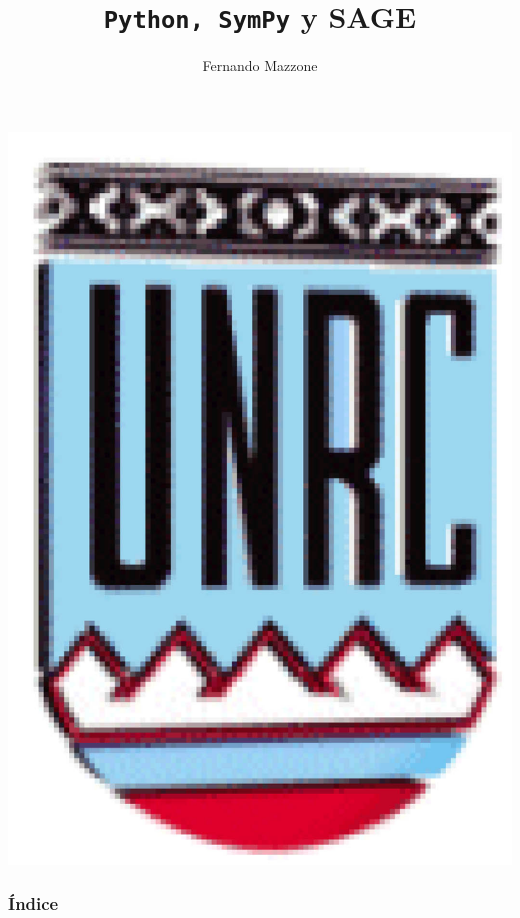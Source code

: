 \documentclass[hyperref={colorlinks=true}]{beamer}
\title[python, SymPy, SAGE] %
{%
\texttt{Python, SymPy} y SAGE
}
\author[] %
{Fernando Mazzone}
\institute[Depto de Matemática] %
{
 Depto de Matemática\\
Facultad de Ciencias Exactas Físico-Químicas y Naturales\\
Universidad Nacional de Río Cuarto}
\begin{document}
\begin{frame}
  \maketitle
  \begin{center}
   \includegraphics[scale=0.2]{imagenes/unrc.jpg}
   \end{center}
\end{frame}
\begin{frame}
    \frametitle{Índice}
\tableofcontents

\end{frame}
\end{document}
